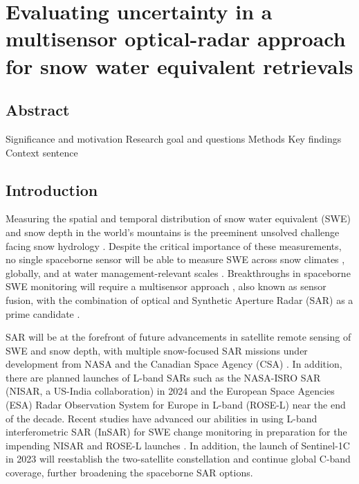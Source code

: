 \hypertarget{ch4}{%
\chapter{Evaluating uncertainty in a multisensor optical-radar approach for snow water equivalent retrievals}\label{ch4}}


\hypertarget{ch4-abstract}{\section{Abstract}\label{ch4-abstract}}
Significance and motivation
Research goal and questions
Methods
Key findings
Context sentence
\hypertarget{ch4-intro}{\section{Introduction}\label{ch4-intro}}

Measuring the spatial and temporal distribution of snow water equivalent (SWE) and snow depth in the world’s mountains is the preeminent unsolved challenge facing snow hydrology \citep{dozierEstimatingSpatialDistribution2016}. Despite the critical importance of these measurements, no single spaceborne sensor will be able to measure SWE across snow climates \citep{sturmSeasonalSnowCover1995, sturmRevisitingGlobalSeasonal2021}, globally, and at water management-relevant scales \citep{lettenmaierInroadsRemoteSensing2015}. Breakthroughs in spaceborne SWE monitoring will require a multisensor approach \citep{durandAchievingBreakthroughsGlobal2021}, also known as sensor fusion, with the combination of optical and Synthetic Aperture Radar (SAR) as a prime candidate \citep{tarriconeEstimatingSnowAccumulation2023a}. 

SAR will be at the forefront of future advancements in satellite remote sensing of SWE and snow depth, with multiple snow-focused SAR missions under development from NASA and the Canadian Space Agency (CSA) \citep{tsangReviewArticleGlobal2022, yuehSatelliteSyntheticAperture2021, garnaudQuantifyingSnowMass2019}. In addition, there are planned launches of L-band SARs such as the NASA-ISRO SAR (NISAR, a US-India collaboration) in 2024 and the European Space Agencies (ESA) Radar Observation System for Europe in L-band (ROSE-L) near the end of the decade. Recent studies have advanced our abilities in using L-band interferometric SAR (InSAR) for SWE change monitoring in preparation for the impending NISAR and ROSE-L launches \citep{tarriconeEstimatingSnowAccumulation2023a, marshallLBandInSARDepth2021, naglerAirborneExperimentInsar2022}. In addition, the launch of Sentinel-1C in 2023 will reestablish the two-satellite constellation and continue global C-band coverage, further broadening the spaceborne SAR options. 

